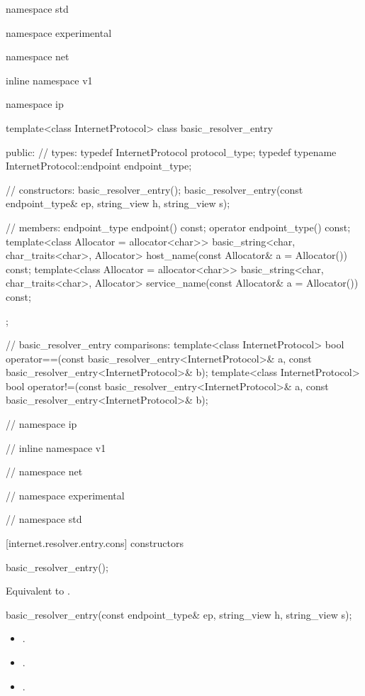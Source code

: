 \begin{codeblock}
namespace std {
namespace experimental {
namespace net {
inline namespace v1 {
namespace ip {

  template<class InternetProtocol>
  class basic_resolver_entry
  {
  public:
    // types:
    typedef InternetProtocol protocol_type;
    typedef typename InternetProtocol::endpoint endpoint_type;

    // constructors:
    basic_resolver_entry();
    basic_resolver_entry(const endpoint_type& ep,
                         string_view h,
                         string_view s);

    // members:
    endpoint_type endpoint() const;
    operator endpoint_type() const;
    template<class Allocator = allocator<char>>
      basic_string<char, char_traits<char>, Allocator>
        host_name(const Allocator& a = Allocator()) const;
    template<class Allocator = allocator<char>>
      basic_string<char, char_traits<char>, Allocator>
        service_name(const Allocator& a = Allocator()) const;
  };

  // basic_resolver_entry comparisons:
  template<class InternetProtocol>
    bool operator==(const basic_resolver_entry<InternetProtocol>& a,
                    const basic_resolver_entry<InternetProtocol>& b);
  template<class InternetProtocol>
    bool operator!=(const basic_resolver_entry<InternetProtocol>& a,
                    const basic_resolver_entry<InternetProtocol>& b);

} // namespace ip
} // inline namespace v1
} // namespace net
} // namespace experimental
} // namespace std
\end{codeblock}


[internet.resolver.entry.cons]{ constructors}

\begin{itemdecl}
basic_resolver_entry();
\end{itemdecl}

\begin{itemdescr}
\pnum
\effects Equivalent to .
\end{itemdescr}

\begin{itemdecl}
basic_resolver_entry(const endpoint_type& ep,
                     string_view h,
                     string_view s);
\end{itemdecl}

\begin{itemdescr}
\pnum
\postconditions 
\begin{itemize}
\item
{}.
\item
{}.
\item
{}.
\end{itemize}
\end{itemdescr}



